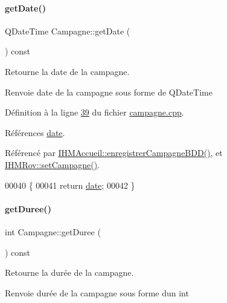 \paragraph{\texorpdfstring{get\+Date()}{getDate()}}
{\footnotesize\ttfamily Q\+Date\+Time Campagne\+::get\+Date (\begin{DoxyParamCaption}{ }\end{DoxyParamCaption}) const}



Retourne la date de la campagne. 

\begin{DoxyReturn}{Renvoie}
date de la campagne sous forme de Q\+Date\+Time 
\end{DoxyReturn}


Définition à la ligne \hyperlink{campagne_8cpp_source_l00039}{39} du fichier \hyperlink{campagne_8cpp_source}{campagne.\+cpp}.



Références \hyperlink{campagne_8h_source_l00042}{date}.



Référencé par \hyperlink{ihmaccueil_8cpp_source_l00273}{I\+H\+M\+Accueil\+::enregistrer\+Campagne\+B\+D\+D()}, et \hyperlink{ihmrov_8cpp_source_l00143}{I\+H\+M\+Rov\+::set\+Campagne()}.


\begin{DoxyCode}
00040 \{
00041     \textcolor{keywordflow}{return} \hyperlink{class_campagne_ac8180e3e533648770c4e6d9a182fe3ed}{date};
00042 \}
\end{DoxyCode}
\mbox{\label{class_campagne_abe02a9050f4a5ea9521dd40b855c350b}} 
\paragraph{\texorpdfstring{get\+Duree()}{getDuree()}}
{\footnotesize\ttfamily int Campagne\+::get\+Duree (\begin{DoxyParamCaption}{ }\end{DoxyParamCaption}) const}



Retourne la durée de la campagne. 

\begin{DoxyReturn}{Renvoie}
durée de la campagne sous forme d\textquotesingle{}un int 
\end{DoxyReturn}


